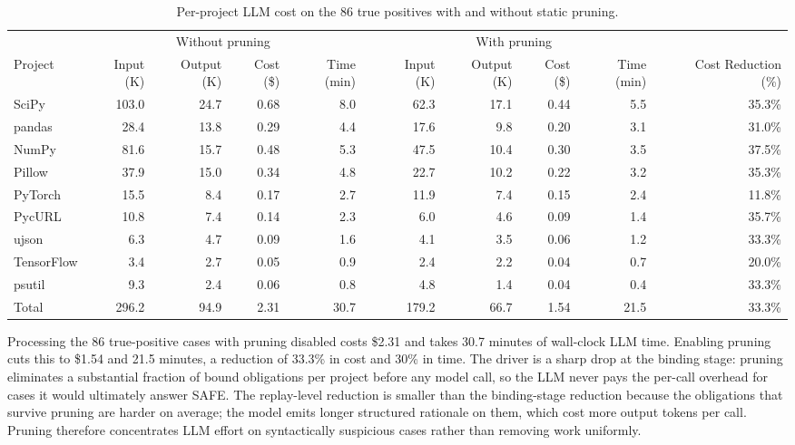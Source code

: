 \begin{table}[t]
\caption{Per-project LLM cost on the 86 true positives with and without static pruning.}
\label{tab:pruning-cost}
\centering
\small
\setlength{\tabcolsep}{4.5pt}
\begin{tabular}{l rrrr c rrrr c r}
\toprule
& \multicolumn{4}{c}{Without pruning} & & \multicolumn{4}{c}{With pruning} & & \\
\cmidrule{2-5} \cmidrule{7-10}
Project & Input (K) & Output (K) & Cost (\$) & Time (min) & &
          Input (K) & Output (K) & Cost (\$) & Time (min) & & Cost Reduction (\%) \\
\midrule
SciPy      & 103.0 & 24.7 & 0.68 & 8.0 & &  62.3 & 17.1 & 0.44 & 5.5 & & 35.3\% \\
pandas     &  28.4 & 13.8 & 0.29 & 4.4 & &  17.6 &  9.8 & 0.20 & 3.1 & & 31.0\% \\
NumPy      &  81.6 & 15.7 & 0.48 & 5.3 & &  47.5 & 10.4 & 0.30 & 3.5 & & 37.5\% \\
Pillow     &  37.9 & 15.0 & 0.34 & 4.8 & &  22.7 & 10.2 & 0.22 & 3.2 & & 35.3\% \\
PyTorch    &  15.5 &  8.4 & 0.17 & 2.7 & &  11.9 &  7.4 & 0.15 & 2.4 & & 11.8\% \\
PycURL     &  10.8 &  7.4 & 0.14 & 2.3 & &   6.0 &  4.6 & 0.09 & 1.4 & & 35.7\% \\
ujson      &   6.3 &  4.7 & 0.09 & 1.6 & &   4.1 &  3.5 & 0.06 & 1.2 & & 33.3\% \\
TensorFlow &   3.4 &  2.7 & 0.05 & 0.9 & &   2.4 &  2.2 & 0.04 & 0.7 & & 20.0\% \\
psutil     &   9.3 &  2.4 & 0.06 & 0.8 & &   4.8 &  1.4 & 0.04 & 0.4 & & 33.3\% \\
\midrule
Total      & 296.2 & 94.9 & 2.31 & 30.7 & & 179.2 & 66.7 & 1.54 & 21.5 & & 33.3\% \\
\bottomrule
\end{tabular}
\end{table}

Processing the 86 true-positive cases with pruning disabled costs
\$2.31 and takes 30.7 minutes of wall-clock LLM time. Enabling
pruning cuts this to \$1.54 and 21.5 minutes, a reduction of 33.3\%
in cost and 30\% in time. The driver is a sharp drop at the
binding stage: pruning eliminates a substantial fraction of bound
obligations per project before any model call, so
the LLM never pays the per-call overhead for cases it would
ultimately answer SAFE. The replay-level reduction is smaller than the
binding-stage reduction because the obligations that survive pruning
are harder on average; the model emits longer structured rationale on them,
which cost more output tokens per call. Pruning therefore
concentrates LLM effort on syntactically suspicious cases rather than
removing work uniformly.

